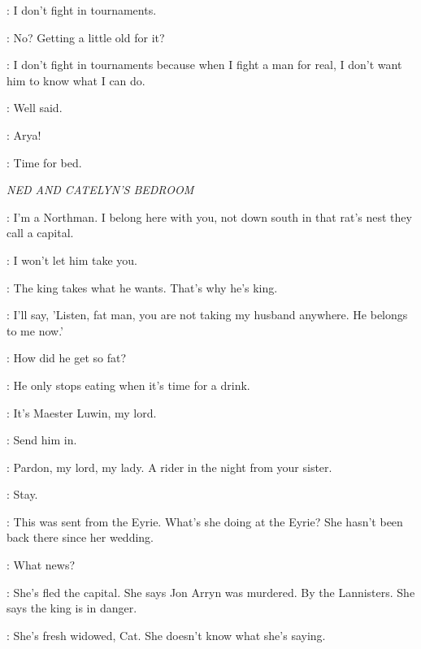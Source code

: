 \NED: I don't fight in tournaments. 

\JAIME: No? Getting a little old for it? 

\NED: I don't fight in tournaments because when I fight a man for real, I don't want him to know what I can do. 

\JAIME: Well said. 


\SANSA: Arya! 


\ROBB: Time for bed. 


\scene

\textit{NED AND CATELYN'S BEDROOM} 


\NED: I'm a Northman. I belong here with you, not down south in that rat's nest they call a capital. 

\CATELYN: I won't let him take you. 

\NED: The king takes what he wants. That's why he's king. 

\CATELYN: I'll say, 'Listen, fat man, you are not taking my husband anywhere. He belongs to me now.' 

\NED: How did he get so fat? 

\CATELYN: He only stops eating when it's time for a drink. 


\SERVANT: It's Maester Luwin, my lord. 

\NED: Send him in. 

\LUWIN: Pardon, my lord, my lady. A rider in the night from your sister. 


\NED: Stay. 

\CATELYN: This was sent from the Eyrie. What's she doing at the Eyrie? She hasn't been back there since her wedding. 


\NED: What news? 

\CATELYN: She's fled the capital. She says Jon Arryn was murdered. By the Lannisters. She says the king is in danger. 

\NED: She's fresh widowed, Cat. She doesn't know what she's saying. 

